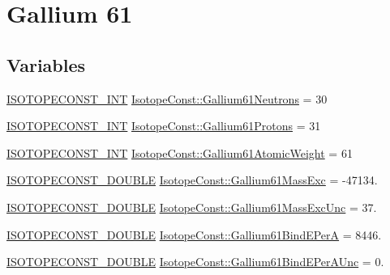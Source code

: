 \hypertarget{group___isotope_const-_gallium-_ga61}{}\section{Gallium 61}
\label{group___isotope_const-_gallium-_ga61}
\subsection*{Variables}
\begin{DoxyCompactItemize}
\item 
\mbox{\hyperlink{group___isotope_const-_macros_ga5f18360b3e99483a35c32d789e62621c}{I\+S\+O\+T\+O\+P\+E\+C\+O\+N\+S\+T\+\_\+\+I\+NT}} \mbox{\hyperlink{group___isotope_const-_gallium-_ga61_ga3260dcfba167fcd4e087096f3a74b02c}{Isotope\+Const\+::\+Gallium61\+Neutrons}} = 30
\item 
\mbox{\hyperlink{group___isotope_const-_macros_ga5f18360b3e99483a35c32d789e62621c}{I\+S\+O\+T\+O\+P\+E\+C\+O\+N\+S\+T\+\_\+\+I\+NT}} \mbox{\hyperlink{group___isotope_const-_gallium-_ga61_ga0f5566f0b31000b7367f179a85a5ffbc}{Isotope\+Const\+::\+Gallium61\+Protons}} = 31
\item 
\mbox{\hyperlink{group___isotope_const-_macros_ga5f18360b3e99483a35c32d789e62621c}{I\+S\+O\+T\+O\+P\+E\+C\+O\+N\+S\+T\+\_\+\+I\+NT}} \mbox{\hyperlink{group___isotope_const-_gallium-_ga61_ga9ee9d82c893da78cc447474eef40d20e}{Isotope\+Const\+::\+Gallium61\+Atomic\+Weight}} = 61
\item 
\mbox{\hyperlink{group___isotope_const-_macros_ga8f45a7272ce02c0b4c65c44636ed719a}{I\+S\+O\+T\+O\+P\+E\+C\+O\+N\+S\+T\+\_\+\+D\+O\+U\+B\+LE}} \mbox{\hyperlink{group___isotope_const-_gallium-_ga61_ga50facd3fe6196e434920c91e61a8c0b0}{Isotope\+Const\+::\+Gallium61\+Mass\+Exc}} = -\/47134.
\item 
\mbox{\hyperlink{group___isotope_const-_macros_ga8f45a7272ce02c0b4c65c44636ed719a}{I\+S\+O\+T\+O\+P\+E\+C\+O\+N\+S\+T\+\_\+\+D\+O\+U\+B\+LE}} \mbox{\hyperlink{group___isotope_const-_gallium-_ga61_ga16bce98d0e00cea3fefb0c38e5fd80c4}{Isotope\+Const\+::\+Gallium61\+Mass\+Exc\+Unc}} = 37.
\item 
\mbox{\hyperlink{group___isotope_const-_macros_ga8f45a7272ce02c0b4c65c44636ed719a}{I\+S\+O\+T\+O\+P\+E\+C\+O\+N\+S\+T\+\_\+\+D\+O\+U\+B\+LE}} \mbox{\hyperlink{group___isotope_const-_gallium-_ga61_gaaedd8e036f16ef04dea369274dfd9267}{Isotope\+Const\+::\+Gallium61\+Bind\+E\+PerA}} = 8446.
\item 
\mbox{\hyperlink{group___isotope_const-_macros_ga8f45a7272ce02c0b4c65c44636ed719a}{I\+S\+O\+T\+O\+P\+E\+C\+O\+N\+S\+T\+\_\+\+D\+O\+U\+B\+LE}} \mbox{\hyperlink{group___isotope_const-_gallium-_ga61_gad64b1f2fb20684be1d30815f6865e82e}{Isotope\+Const\+::\+Gallium61\+Bind\+E\+Per\+A\+Unc}} = 0.

\end{DoxyCompactItemize}
